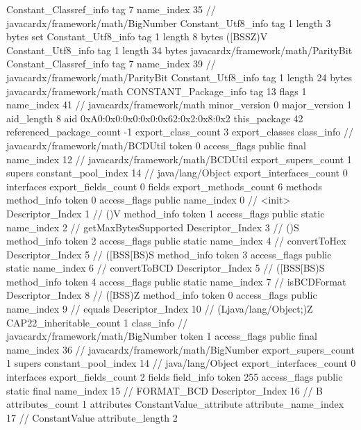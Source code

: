 {{{		}
		Constant_Classref_info {
			tag	7
			name_index	35		// javacardx/framework/math/BigNumber
		}
		Constant_Utf8_info {
			tag	1
			length	3
			bytes	set
		}
		Constant_Utf8_info {
			tag	1
			length	8
			bytes	([BSSZ)V
		}
		Constant_Utf8_info {
			tag	1
			length	34
			bytes	javacardx/framework/math/ParityBit
		}
		Constant_Classref_info {
			tag	7
			name_index	39		// javacardx/framework/math/ParityBit
		}
		Constant_Utf8_info {
			tag	1
			length	24
			bytes	javacardx/framework/math
		}
		CONSTANT_Package_info {
			tag	13
			flags	1
			name_index	41		// javacardx/framework/math
			minor_version	0
			major_version	1
			aid_length	8
			aid	0xA0:0x0:0x0:0x0:0x62:0x2:0x8:0x2
		}
	}
	this_package	42
	referenced_package_count	-1
	export_class_count	3
	export_classes {
		class_info {		// javacardx/framework/math/BCDUtil
			token	0
			access_flags	public final
			name_index	12		// javacardx/framework/math/BCDUtil
			export_supers_count	1
			supers {
				constant_pool_index	14		// java/lang/Object
			}
			export_interfaces_count	0
			interfaces {
			}
			export_fields_count	0
			fields {
			}
			export_methods_count	6
			methods {
				method_info {
					token	0
					access_flags	public
					name_index	0		// <init>
					Descriptor_Index	1		// ()V
				}
				method_info {
					token	1
					access_flags	public static
					name_index	2		// getMaxBytesSupported
					Descriptor_Index	3		// ()S
				}
				method_info {
					token	2
					access_flags	public static
					name_index	4		// convertToHex
					Descriptor_Index	5		// ([BSS[BS)S
				}
				method_info {
					token	3
					access_flags	public static
					name_index	6		// convertToBCD
					Descriptor_Index	5		// ([BSS[BS)S
				}
				method_info {
					token	4
					access_flags	public static
					name_index	7		// isBCDFormat
					Descriptor_Index	8		// ([BSS)Z
				}
				method_info {
					token	0
					access_flags	public
					name_index	9		// equals
					Descriptor_Index	10		// (Ljava/lang/Object;)Z
				}
			}
			CAP22_inheritable_count	1
		}
		class_info {		// javacardx/framework/math/BigNumber
			token	1
			access_flags	public final
			name_index	36		// javacardx/framework/math/BigNumber
			export_supers_count	1
			supers {
				constant_pool_index	14		// java/lang/Object
			}
			export_interfaces_count	0
			interfaces {
			}
			export_fields_count	2
			fields {
			field_info {
				token	255
				access_flags	public static final
				name_index	15		// FORMAT_BCD
				Descriptor_Index	16		// B
				attributes_count	1
				attributes {
				ConstantValue_attribute {
					attribute_name_index	17		// ConstantValue
					attribute_length	2
}}}}}}}
